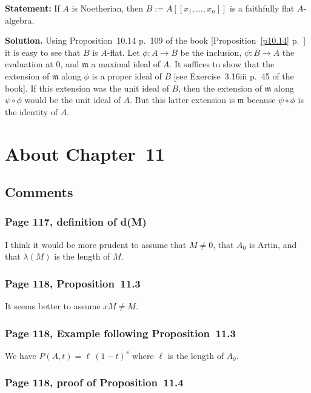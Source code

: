 \documentclass[12pt,letterpaper]{article}%
\newcommand{\mf}{\mathfrak}
\newcommand{\mmm}{\mf m}
\newcommand{\nn}{\noindent}
\begin{document}
\nn\textbf{Statement:} If $A$ is Noetherian, then $B:=A[[x_1,\ldots,x_n]]$ is a faithfully flat $A$-algebra. 

\nn\textbf{Solution.} Using Proposition~10.14 p.~109 of the book [Proposition~\ref{p10.14} p.~\pageref{p10.14}] it is easy to see that $B$ is $A$-flat. Let $\phi:A\to B$ be the inclusion, $\psi:B\to A$ the evaluation at $0$, and $\mmm$ a maximal ideal of $A$. It suffices to show that the extension of $\mmm$ along $\phi$ is a proper ideal of $B$ [see Exercise~3.16iii p.~45 of the book]. If this extension was the unit ideal of $B$, then the extension of $\mmm$ along $\psi\circ\phi$ would be the unit ideal of $A$. But this latter extension is $\mmm$ because $\psi\circ\phi$ is the identity of $A$.

\newpage

\section{About Chapter~11}%

\subsection{Comments}%

\subsubsection{Page 117, definition of d(M)}%

I think it would be more prudent to assume that $M\ne0$, that $A_0$ is Artin, and that $\lambda(M)$ is the length of $M$. 

\subsubsection{Page 118, Proposition~11.3}%

It seems better to assume $xM\ne M$. 

\subsubsection{Page 118, Example following Proposition~11.3}%

We have $P(A,t)=\ell\,(1-t)^s$ where $\ell$ is the length of $A_0$. 

\subsubsection{Page 118, proof of Proposition~11.4}%
\end{document}
